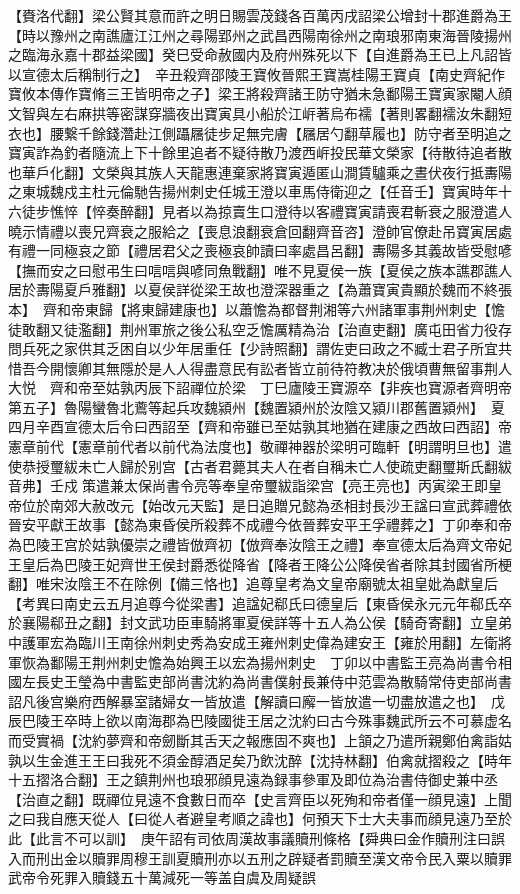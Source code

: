 【賚洛代翻】梁公賢其意而許之明日賜雲茂錢各百萬丙戌詔梁公增封十郡進爵為王【時以豫州之南譙廬江江州之尋陽郢州之武昌西陽南徐州之南琅邪南東海晉陵揚州之臨海永嘉十郡益梁國】癸巳受命赦國内及府州殊死以下【自進爵為王已上凡詔皆以宣德太后稱制行之】　辛丑殺齊邵陵王寶攸晉熙王寶嵩桂陽王寶貞【南史齊紀作寶攸本傳作寶脩三王皆明帝之子】梁王將殺齊諸王防守猶未急鄱陽王寶寅家閹人顔文智與左右麻拱等密謀穿牆夜出寶寅具小船於江㟁著烏布襦【著則畧翻襦汝朱翻短衣也】腰繋千餘錢濳赴江側躡屩徒步足無完膚【屩居勺翻草履也】防守者至明追之寶寅詐為釣者隨流上下十餘里追者不疑待散乃渡西㟁投民華文榮家【待散待追者散也華戶化翻】文榮與其族人天龍惠連棄家將寶寅遁匿山澗賃驢乘之晝伏夜行抵夀陽之東城魏戍主杜元倫馳告揚州刺史任城王澄以車馬侍衛迎之【任音壬】寶寅時年十六徒步憔悴【悴奏醉翻】見者以為掠賣生口澄待以客禮寶寅請喪君斬衰之服澄遣人曉示情禮以喪兄齊衰之服給之【喪息浪翻衰倉回翻齊音咨】澄帥官僚赴吊寶寅居處有禮一同極哀之節【禮居君父之喪極哀帥讀曰率處昌呂翻】夀陽多其義故皆受慰喭【撫而安之曰慰弔生曰唁唁與喭同魚戰翻】唯不見夏侯一族【夏侯之族本譙郡譙人居於夀陽夏戶雅翻】以夏侯詳從梁王故也澄深器重之【為蕭寶寅貴顯於魏而不終張本】　齊和帝東歸【將東歸建康也】以蕭憺為都督荆湘等六州諸軍事荆州刺史【憺徒敢翻又徒濫翻】荆州軍旅之後公私空乏憺厲精為治【治直吏翻】廣屯田省力役存問兵死之家供其乏困自以少年居重任【少詩照翻】謂佐吏曰政之不臧士君子所宜共惜吾今開懷卿其無隱於是人人得盡意民有訟者皆立前待符教决於俄頃曹無留事荆人大悦　齊和帝至姑孰丙辰下詔禪位於梁　丁巳廬陵王寶源卒【非疾也寶源者齊明帝第五子】魯陽蠻魯北鷰等起兵攻魏潁州【魏置潁州於汝陰又潁川郡舊置潁州】　夏四月辛酉宣德太后令曰西詔至【齊和帝雖已至姑孰其地猶在建康之西故曰西詔】帝憲章前代【憲章前代者以前代為法度也】敬禪神器於梁明可臨軒【明謂明旦也】遣使恭授璽紱未亡人歸於别宫【古者君薨其夫人在者自稱未亡人使疏吏翻璽斯氏翻紱音弗】壬戍策遣兼太保尚書令亮等奉皇帝璽紱詣梁宫【亮王亮也】丙寅梁王即皇帝位於南郊大赦改元【始改元天監】是日追贈兄懿為丞相封長沙王諡曰宣武葬禮依晉安平獻王故事【懿為東昏侯所殺葬不成禮今依晉葬安平王孚禮葬之】丁卯奉和帝為巴陵王宫於姑孰優崇之禮皆倣齊初【倣齊奉汝陰王之禮】奉宣德太后為齊文帝妃王皇后為巴陵王妃齊世王侯封爵悉從降省【降者王降公公降侯省者除其封國省所梗翻】唯宋汝陰王不在除例【備三恪也】追尊皇考為文皇帝廟號太祖皇妣為獻皇后【考異曰南史云五月追尊今從梁書】追諡妃郗氏曰德皇后【東昏侯永元元年郗氏卒於襄陽郗丑之翻】封文武功臣車騎將軍夏侯詳等十五人為公侯【騎奇寄翻】立皇弟中護軍宏為臨川王南徐州刺史秀為安成王雍州刺史偉為建安王【雍於用翻】左衛將軍恢為鄱陽王荆州刺史憺為始興王以宏為揚州刺史　丁卯以中書監王亮為尚書令相國左長史王瑩為中書監吏部尚書沈約為尚書僕射長兼侍中范雲為散騎常侍吏部尚書　詔凡後宫樂府西解暴室諸婦女一皆放遣【解讀曰廨一皆放遣一切盡放遣之也】　戊辰巴陵王卒時上欲以南海郡為巴陵國徙王居之沈約曰古今殊事魏武所云不可慕虚名而受實禍【沈約夢齊和帝劒斷其舌天之報應固不爽也】上頷之乃遣所親鄭伯禽詣姑孰以生金進王王曰我死不須金醇酒足矣乃飲沈醉【沈持林翻】伯禽就摺殺之【時年十五摺洛合翻】王之鎮荆州也琅邪顔見遠為録事參軍及即位為治書侍御史兼中丞【治直之翻】既禪位見遠不食數日而卒【史言齊臣以死殉和帝者僅一顔見遠】上聞之曰我自應天從人【曰從人者避皇考順之諱也】何預天下士大夫事而顔見遠乃至於此【此言不可以訓】　庚午詔有司依周漢故事議贖刑條格【舜典曰金作贖刑注曰誤入而刑出金以贖罪周穆王訓夏贖刑亦以五刑之辟疑者罰贖至漢文帝令民入粟以贖罪武帝令死罪入贖錢五十萬減死一等盖自虞及周疑誤